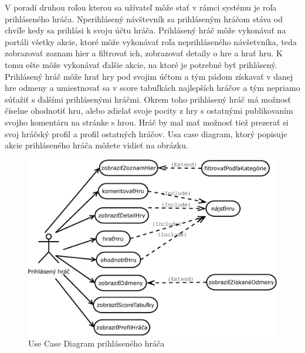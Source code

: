 V poradí druhou roľou kterou sa užívateľ môže stať v rámci systému je roľa prihláseného hráča. Nperihlásený návštevník sa prihláseným hráčom stáva od chvíľe kedy sa prihlási k svoju účtu hráča.  Prihlásený hráč môže vykonávať na portáli všetky akcie, ktoré môže vykonávať roľa neprihláseného návšetvníka, teda zobrazovať zoznam hier a filtrovať ich, zobrazovať detaily o hre a hrať hru. K tomu ešte môže vykonávať ďalšie akcie, na ktoré je potrebné byť prihlásený. Prihlásený hráč môže hrať hry pod svojim účtom a tým pádom získavať v danej hre odmeny a umiestnovať sa v score tabuľkách najlepších hráčov a tým nepriamo súťažiť s ďalšími prihlásenými hráčmi. Okrem toho prihlásený hráč má možnosť číselne ohodnotiť hru, alebo zdielať svoje pocity z hry s ostatnými publikovaním svojho komentáru na stránke s hrou. Hráč by mal mať možnosť tiež prezerať si svoj hráčský profil a profil ostatných hráčov. Usa case diagram, ktorý popisuje akcie prihláseného hráča môžete vidieť na obrázku.
\begin{figure}[h]
  \centering
  \includegraphics[scale=0.4]{fig/ucd-prihlasenyhrac.eps}
  \caption{Use Case Diagram prihláseného hráča}
  \label{fig:ucdprihlasenyhrac}
\end{figure}

